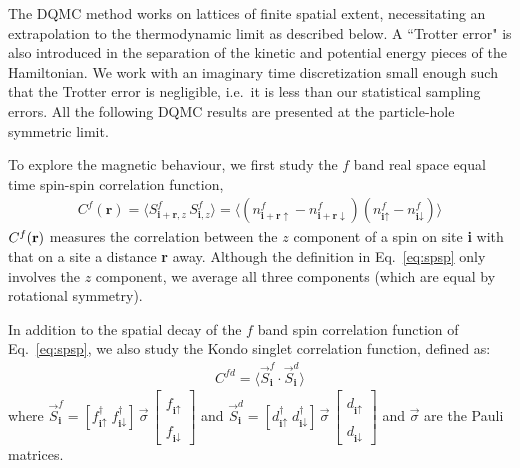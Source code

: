 \documentclass[pra,letterpaper,10pt,twocolumn]{revtex4}
\begin{document}
The DQMC method works on lattices of finite spatial extent,
necessitating an extrapolation to the thermodynamic limit as described
below.  A ``Trotter error" is also introduced in the separation
of the kinetic and potential energy pieces of the Hamiltonian. 
We work with an imaginary time discretization small enough such that
the Trotter error is negligible, i.e.~it is
less than our statistical sampling errors.
All the following DQMC results are presented at the particle-hole symmetric
limit.

To explore the magnetic behaviour, we first study the $f$ band
real space equal time spin-spin correlation function,
\begin{align}
  C^f(\textbf{r})=\langle S^f_{\textbf{i}+\textbf{r}, z}\,
S^f_{\textbf{i},z} \rangle=\langle(n^f_{\textbf{i}+\textbf{r}\uparrow}
-n^f_{\textbf{i}+\textbf{r}\downarrow})
(n^f_{\textbf{i}\uparrow}-n^f_{\textbf{i}\downarrow})\rangle
\label{eq:spsp}
\end{align}
$C^f({\textbf r})$ measures the correlation between the $z$ component of a spin on site
\textbf{i} with that on a site a distance \textbf{r} away. 
Although the definition in Eq.~\ref{eq:spsp} only
involves the $z$ component, we average
all three components (which are equal by rotational
symmetry).

In addition to the spatial decay of the $f$ band spin 
correlation function of Eq.~\ref{eq:spsp}, we also
study the Kondo singlet correlation function\cite{Huscroft99}, 
defined as:
\begin{align}
  C^{fd}=\langle \vec{S}^f_{\textbf{i}}\cdot \vec{S}^d_{\textbf{i}} \rangle
\label{eq:spsp_cfd}
\end{align}
where $\vec{S}^f_{\textbf{i}} = [f^{\dagger}_{\textbf{i} \uparrow} \;
f^{\dagger}_{\textbf{i} \downarrow}] \, {\vec \sigma} \, \left[ \begin{array}{c}
f^{\phantom{\dagger}}_{\textbf{i} \uparrow} \\
f^{\phantom{\dagger}}_{\textbf{i} \downarrow} \end{array}  \right]$ and
$\vec{S}^d_{\textbf{i}} = [d^{\dagger}_{\textbf{i} \uparrow} \;
d^{\dagger}_{\textbf{i} \downarrow}] \, {\vec \sigma} \, \left[ \begin{array}{c}
d^{\phantom{\dagger}}_{\textbf{i} \uparrow} \\
d^{\phantom{\dagger}}_{\textbf{i} \downarrow} \end{array}  \right]$ and
\textbf{$\vec \sigma$} are the Pauli matrices.
\end{document}
